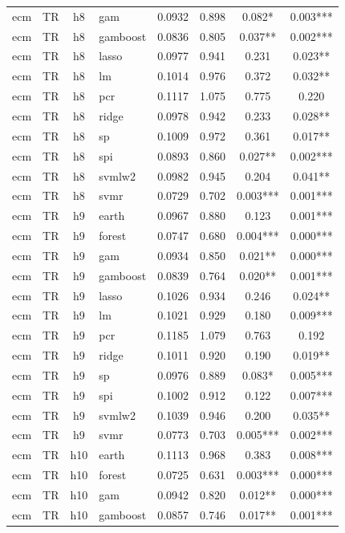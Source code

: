 \begin{ThreePartTable}
\begin{longtable}[t]{llclcccc}
ecm & TR & h8 & gam & 0.0932 & 0.898 & 0.082* & 0.003***\\
ecm & TR & h8 & gamboost & 0.0836 & 0.805 & 0.037** & 0.002***\\
ecm & TR & h8 & lasso & 0.0977 & 0.941 & 0.231 & 0.023**\\
ecm & TR & h8 & lm & 0.1014 & 0.976 & 0.372 & 0.032**\\
ecm & TR & h8 & pcr & 0.1117 & 1.075 & 0.775 & 0.220\\
ecm & TR & h8 & ridge & 0.0978 & 0.942 & 0.233 & 0.028**\\
ecm & TR & h8 & sp & 0.1009 & 0.972 & 0.361 & 0.017**\\
ecm & TR & h8 & spi & 0.0893 & 0.860 & 0.027** & 0.002***\\
ecm & TR & h8 & svmlw2 & 0.0982 & 0.945 & 0.204 & 0.041**\\
ecm & TR & h8 & svmr & 0.0729 & 0.702 & 0.003*** & 0.001***\\
\addlinespace
ecm & TR & h9 & earth & 0.0967 & 0.880 & 0.123 & 0.001***\\
ecm & TR & h9 & forest & 0.0747 & 0.680 & 0.004*** & 0.000***\\
ecm & TR & h9 & gam & 0.0934 & 0.850 & 0.021** & 0.000***\\
ecm & TR & h9 & gamboost & 0.0839 & 0.764 & 0.020** & 0.001***\\
ecm & TR & h9 & lasso & 0.1026 & 0.934 & 0.246 & 0.024**\\
ecm & TR & h9 & lm & 0.1021 & 0.929 & 0.180 & 0.009***\\
ecm & TR & h9 & pcr & 0.1185 & 1.079 & 0.763 & 0.192\\
ecm & TR & h9 & ridge & 0.1011 & 0.920 & 0.190 & 0.019**\\
ecm & TR & h9 & sp & 0.0976 & 0.889 & 0.083* & 0.005***\\
ecm & TR & h9 & spi & 0.1002 & 0.912 & 0.122 & 0.007***\\
ecm & TR & h9 & svmlw2 & 0.1039 & 0.946 & 0.200 & 0.035**\\
ecm & TR & h9 & svmr & 0.0773 & 0.703 & 0.005*** & 0.002***\\
\addlinespace
ecm & TR & h10 & earth & 0.1113 & 0.968 & 0.383 & 0.008***\\
ecm & TR & h10 & forest & 0.0725 & 0.631 & 0.003*** & 0.000***\\
ecm & TR & h10 & gam & 0.0942 & 0.820 & 0.012** & 0.000***\\
ecm & TR & h10 & gamboost & 0.0857 & 0.746 & 0.017** & 0.001***\\

\end{longtable}
\end{ThreePartTable}
